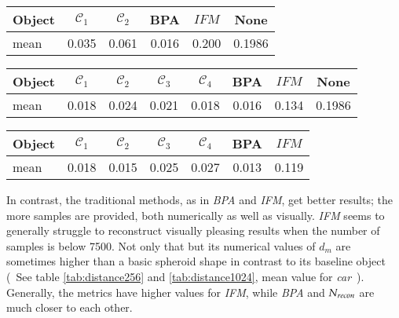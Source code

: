 \begin{center}
     \label{tab:distance256opt} 
    \begin{tabular}{| l  | c  | c | c | c || c |}
        \hline
        Object& $\mathcal{C}_1$ & $\mathcal{C}_2$ & BPA & $IFM$  & None\\ \hline
        mean&0.035&0.061&0.016&0.200&0.1986\\        \hline
    \end{tabular}
\end{center}
\begin{center}
     \label{tab:distance1024opt} 
    \begin{tabular}{| l  | c | c | c | c | c | c || c |}
        \hline
        Object& $\mathcal{C}_1$ & $\mathcal{C}_2$ & $\mathcal{C}_3$ & $\mathcal{C}_4$ & BPA & $IFM$ & None\\ \hline
        mean&0.018&0.024&0.021&0.018&0.016&0.134 & 0.1986\\        \hline
    \end{tabular}
\end{center}
\begin{center}
     \label{tab:distance7500} 
    \begin{tabular}{| l  | c | c | c | c  | c | c |}
        \hline
        Object& $\mathcal{C}_1$ & $\mathcal{C}_2$ & $\mathcal{C}_3$ &  $\mathcal{C}_4$ & BPA & $IFM$  \\ \hline
        mean&0.018&0.015 & 0.025 & 0.027&0.013&0.119\\\hline
    \end{tabular}
\end{center}
    In contrast, the traditional methods, as in \emph{BPA} and \emph{IFM}, get better results; the more samples are provided, both
    numerically as well as visually.
    \emph{IFM} seems to generally struggle to reconstruct visually pleasing results when the number of samples is below 7500.
    Not only that but its numerical values of $d_m$ are sometimes higher than a basic spheroid shape in contrast to its baseline 
    object (~See table \ref{tab:distance256} and \ref{tab:distance1024},  mean value for \emph{car}~). Generally, the metrics have
    higher values for \emph{IFM}, while \emph{BPA} and $\emph{N}_{recon}$ are much closer to each other.

